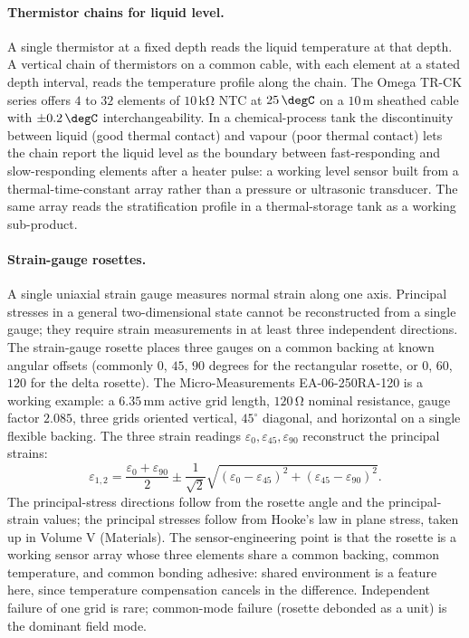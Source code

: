 \paragraph{Thermistor chains for liquid level.}
A single thermistor at a fixed depth reads the liquid temperature at
that depth. A vertical chain of thermistors on a common cable, with
each element at a stated depth interval, reads the temperature
profile along the chain. The Omega TR-CK series
\cite{text:ch05t3-omega-trck-datasheet} offers $4$ to $32$ elements
of $10 \,\si{\kilo\ohm}$ NTC at $25 \,\degC$ on a $10 \,\si{\meter}$
sheathed cable with $\pm 0.2 \,\degC$ interchangeability. In a
chemical-process tank the discontinuity between liquid (good thermal
contact) and vapour (poor thermal contact) lets the chain report the
liquid level as the boundary between fast-responding and
slow-responding elements after a heater pulse: a working level
sensor built from a thermal-time-constant array rather than a
pressure or ultrasonic transducer. The same array reads the
stratification profile in a thermal-storage tank as a working
sub-product.

\paragraph{Strain-gauge rosettes.}
A single uniaxial strain gauge measures normal strain along one
axis. Principal stresses in a general two-dimensional state cannot
be reconstructed from a single gauge; they require strain
measurements in at least three independent directions. The
strain-gauge rosette places three gauges on a common backing at
known angular offsets (commonly $0$, $45$, $90$ degrees for the
rectangular rosette, or $0$, $60$, $120$ for the delta rosette). The
Micro-Measurements EA-06-250RA-120
\cite{text:ch05t3-micromeas-ea06250ra-datasheet} is a working
example: a $6.35 \,\si{\milli\meter}$ active grid length, $120 \,\si
{\ohm}$ nominal resistance, gauge factor $2.085$, three grids
oriented vertical, $45^{\circ}$ diagonal, and horizontal on a single
flexible backing. The three strain readings
$\varepsilon_{0}, \varepsilon_{45}, \varepsilon_{90}$ reconstruct
the principal strains:
\[
\varepsilon_{1,2} = \frac{\varepsilon_{0} + \varepsilon_{90}}{2}
\pm \frac{1}{\sqrt{2}} \sqrt{(\varepsilon_{0} - \varepsilon_{45})^{2}
+ (\varepsilon_{45} - \varepsilon_{90})^{2}}.
\]
The principal-stress directions follow from the rosette angle and
the principal-strain values; the principal stresses follow from
Hooke's law in plane stress, taken up in Volume V (Materials). The
sensor-engineering point is that the rosette is a working sensor
array whose three elements share a common backing, common
temperature, and common bonding adhesive: shared environment is a
feature here, since temperature compensation cancels in the
difference. Independent failure of one grid is rare; common-mode
failure (rosette debonded as a unit) is the dominant field mode.


